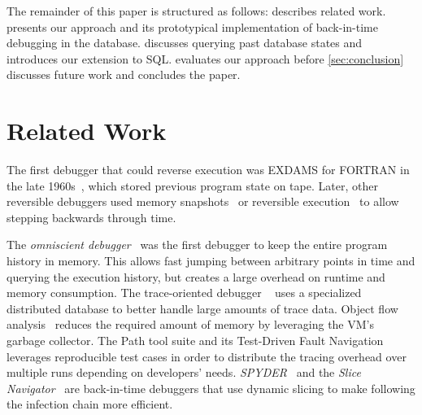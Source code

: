 \documentclass[english,conference,final]{IEEEtran}
\begin{document}
The remainder of this paper is structured as follows:
 describes related work. 
 presents our approach and its prototypical implementation of back-in-time debugging in the database.
 discusses querying past database states and introduces our extension to SQL.
 evaluates our approach before \cref{sec:conclusion} discusses future work and concludes the paper.


\section{Related Work}
\label{sec:relatedWork}

The first debugger that could reverse execution was EXDAMS for FORTRAN in the late 1960s~\cite{balzer_exdams:_1969}, which stored previous program state on tape.
Later, other reversible debuggers used memory snapshots~\cite{feldman_igor:_1988} or reversible execution~\cite{lieberman1997zstep} to allow stepping backwards through time.

The \emph{omniscient debugger}~\cite{lewis_debugging_2003} was the first debugger to keep the entire program history in memory.
This allows fast jumping between arbitrary points in time and querying the execution history, but creates a large overhead on runtime and memory consumption.
The trace-oriented debugger ~\cite{pothier_scalable_2007} uses a specialized distributed database to better handle large amounts of trace data.
Object  flow  analysis~\cite{lienhard_practical_2008} reduces the required amount of memory by leveraging the VM's garbage collector.
The Path tool suite and its Test-Driven Fault Navigation~\cite{perscheid2013} leverages reproducible test cases in order to distribute the tracing overhead over multiple runs depending on developers' needs.
\emph{SPYDER}~\cite{agrawal_debugging_1993} and the \emph{Slice Navigator}~\cite{treffer2016} are back-in-time debuggers that use dynamic slicing to make following the infection chain more efficient.
\end{document}
